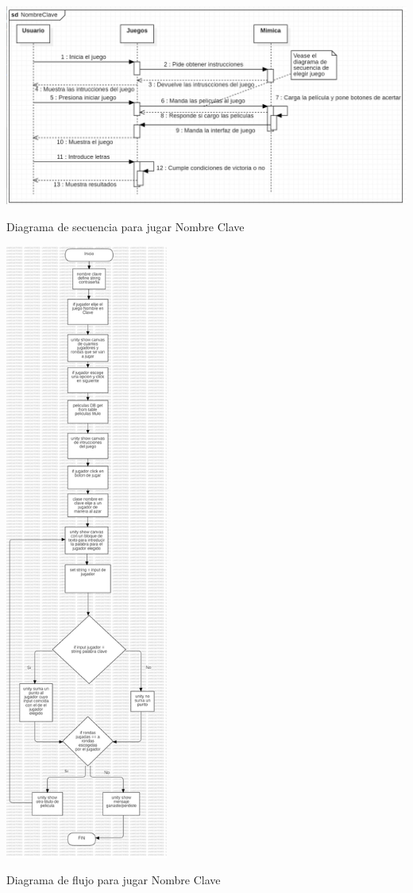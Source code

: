 \documentclass[12pt, oneside, letterpaper]{book}
\begin{document}
\begin{center}
	\centering
		\includegraphics[width=1.29\textwidth]{DSFNNombreClave.png}

	\caption{Diagrama de secuencia para jugar Nombre Clave}
	\label{DSFNC}
\end{center}

\begin{center}
	\centering
		\includegraphics[width=0.4\textwidth]{DFFNNombreEnClave.jpg}

	\caption{Diagrama de flujo para jugar Nombre Clave}
	\label{DSFNC}
\end{center}
\end{document}
